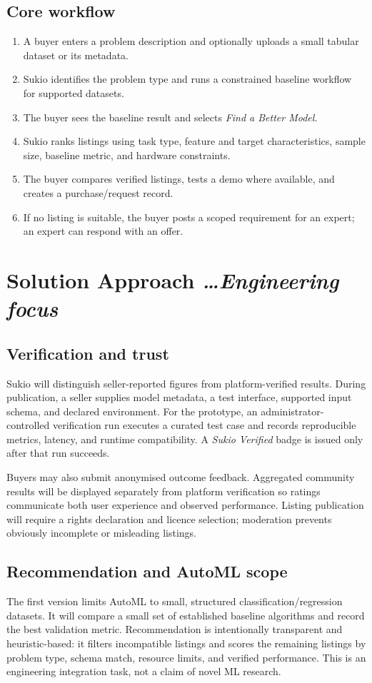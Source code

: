 \documentclass[11pt,a4paper]{article}
\newcommand{\BvrHint}[1]{{\normalfont\normalsize\itshape\hfill #1}}
\begin{document}
\subsection{Core workflow}
\begin{enumerate}[leftmargin=0.7cm]
  \item A buyer enters a problem description and optionally uploads a small tabular dataset or its metadata.
  \item Sukio identifies the problem type and runs a constrained baseline workflow for supported datasets.
  \item The buyer sees the baseline result and selects \emph{Find a Better Model}.
  \item Sukio ranks listings using task type, feature and target characteristics, sample size, baseline metric, and hardware constraints.
  \item The buyer compares verified listings, tests a demo where available, and creates a purchase/request record.
  \item If no listing is suitable, the buyer posts a scoped requirement for an expert; an expert can respond with an offer.
\end{enumerate}

\section{Solution Approach \BvrHint{\ldots Engineering focus}}
\subsection{Verification and trust}
Sukio will distinguish seller-reported figures from platform-verified results. During publication, a seller supplies model metadata, a test interface, supported input schema, and declared environment. For the prototype, an administrator-controlled verification run executes a curated test case and records reproducible metrics, latency, and runtime compatibility. A \emph{Sukio Verified} badge is issued only after that run succeeds.

Buyers may also submit anonymised outcome feedback. Aggregated community results will be displayed separately from platform verification so ratings communicate both user experience and observed performance. Listing publication will require a rights declaration and licence selection; moderation prevents obviously incomplete or misleading listings.

\subsection{Recommendation and AutoML scope}
The first version limits AutoML to small, structured classification/regression datasets. It will compare a small set of established baseline algorithms and record the best validation metric. Recommendation is intentionally transparent and heuristic-based: it filters incompatible listings and scores the remaining listings by problem type, schema match, resource limits, and verified performance. This is an engineering integration task, not a claim of novel ML research.
\end{document}
